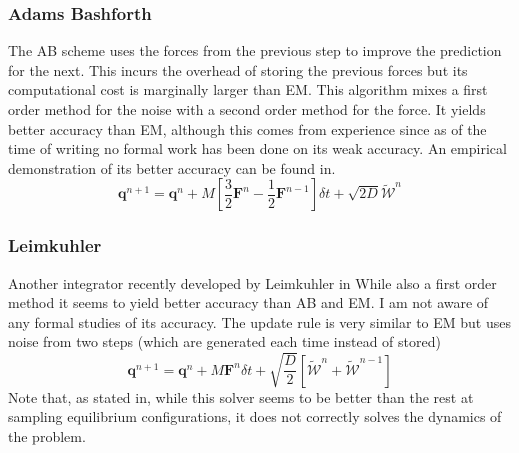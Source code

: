 \documentclass[ twoside,openright,titlepage,numbers=noenddot,%
headinclude,footinclude,cleardoublepage=empty,abstract=on,
BCOR=5mm,paper=a4,fontsize=11pt, dvipsnames
]{scrreprt}
\renewcommand{\vec}[1]{\bm{#1}}
\newcommand{\dt}{\delta t}
\newcommand{\half}{\frac{1}{2}}
\newcommand{\noise}{\widetilde{W}}
\newcommand{\ppos}{q}
\begin{document}
\subsubsection*{Adams Bashforth}
The \gls{AB} scheme uses the forces from the previous step to improve the prediction for the next. This incurs the overhead of storing the previous forces but its computational cost is marginally larger than \gls{EM}. This algorithm mixes a first order method for the noise with a second order method for the force. It yields better accuracy than \gls{EM}, although this comes from experience since as of the time of writing no formal work has been done on its weak accuracy. An empirical demonstration of its better accuracy can be found in\cite{Balboa2017}.
\begin{equation}
  \vec{\ppos}^{n+1} = \vec{\ppos}^n + M\left[\frac{3}{2}\vec{F}^n - \half \vec{F}^{n-1}\right]\dt + \sqrt{2D}\vec{\mathcal{\noise}}^n
\end{equation}

\subsubsection*{Leimkuhler}
Another integrator recently developed by Leimkuhler in\cite{Leimkuhler2015}
 While also a first order method it seems to yield better accuracy than \gls{AB} and \gls{EM}. I am not aware of any formal studies of its accuracy.
 The update rule is very similar to \gls{EM} but uses noise from two steps (which are generated each time instead of stored)
 \begin{equation}
  \vec{\ppos}^{n+1} = \vec{\ppos}^n + M\vec{F}^n\dt + \sqrt{\frac{D}{2}}\left[\vec{\mathcal{\noise}}^n + \vec{\mathcal{\noise}}^{n-1}\right]
\end{equation}
Note that, as stated in\cite{Leimkuhler2015}, while this solver seems to be better than the rest at sampling equilibrium configurations, it does not correctly solves the dynamics of the problem.
\end{document}
